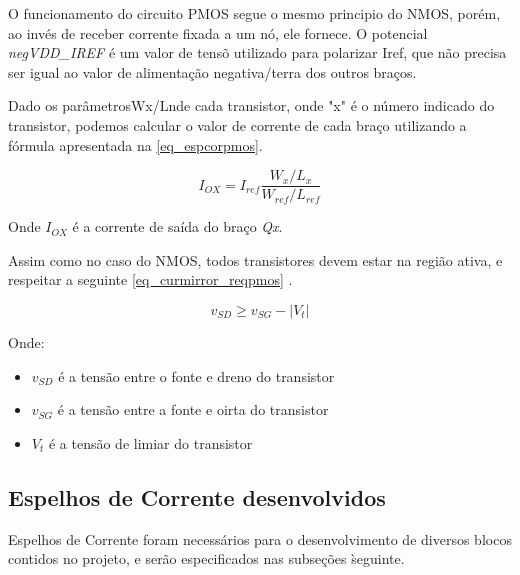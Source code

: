 O funcionamento do circuito PMOS segue o mesmo principio do NMOS, porém, ao inv\'es de receber corrente fixada a um n\'o, ele fornece. O potencial \emph{negVDD\_IREF} \'e um valor de tens\~o utilizado para polarizar Iref, que n\~ao precisa ser igual ao valor de alimenta{\c c}\~ao negativa/terra dos outros bra{\c c}os.

Dado os parâmetrosWx/Lnde cada transistor, onde "x" é o número indicado do transistor, podemos calcular o valor de corrente de cada braço utilizando a fórmula apresentada na \autoref{eq_espcorpmos}.

\begin{equation}
    \label{eq_espcorpmos}
    I_{OX} = I_{ref}\frac{W_x/L_x}{W_{ref}/L_{ref}}
\end{equation}

Onde $I_{OX}$ \'e a corrente de sa\'ida do bra{\c c}o \emph{Qx}. 

Assim como no caso do NMOS, todos transistores devem estar na regi\~ao ativa, e respeitar a seguinte \autoref{eq_curmirror_reqpmos} \cite{RazaviFundM}.

\begin{equation}
    \label{eq_curmirror_reqpmos}
    v_{SD} \geq v_{SG} - |V_t|
\end{equation}

Onde:

\begin{itemize}
    \item $v_{SD}$ \'e a tens\~ao entre o fonte e dreno do transistor
    \item $v_{SG}$ \'e a tens\~ao entre a fonte e oirta do transistor
    \item $V_{t}$ \'e a tens\~ao de limiar do transistor
\end{itemize}

\subsection{Espelhos de Corrente desenvolvidos}

Espelhos de Corrente foram necess\'arios para o desenvolvimento de diversos blocos contidos no projeto, e ser\~ao especificados nas subse{\c c}\~oes \` seguinte.

\newcommand{\NomeBlocoNoUnderline}{NULL}
\newcommand{\NomeQTab}{NULL}


